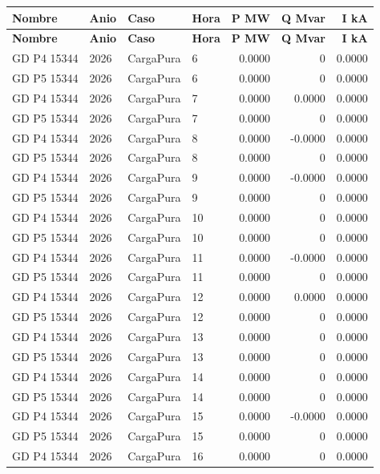 \documentclass[11pt,a4paper]{article}
\begin{document}
\small
\begin{longtable}{llllrrr}
\toprule
\textbf{Nombre} & \textbf{Anio} & \textbf{Caso} & \textbf{Hora} & \textbf{P MW} & \textbf{Q Mvar} & \textbf{I kA} \\
\midrule
\endfirsthead
\toprule
\textbf{Nombre} & \textbf{Anio} & \textbf{Caso} & \textbf{Hora} & \textbf{P MW} & \textbf{Q Mvar} & \textbf{I kA} \\
\midrule
\endhead
\bottomrule
\endfoot
GD P4 15344 & 2026 & CargaPura & 6 & 0.0000 & 0 & 0.0000 \\
GD P5 15344 & 2026 & CargaPura & 6 & 0.0000 & 0 & 0.0000 \\
GD P4 15344 & 2026 & CargaPura & 7 & 0.0000 & 0.0000 & 0.0000 \\
GD P5 15344 & 2026 & CargaPura & 7 & 0.0000 & 0 & 0.0000 \\
GD P4 15344 & 2026 & CargaPura & 8 & 0.0000 & -0.0000 & 0.0000 \\
GD P5 15344 & 2026 & CargaPura & 8 & 0.0000 & 0 & 0.0000 \\
GD P4 15344 & 2026 & CargaPura & 9 & 0.0000 & -0.0000 & 0.0000 \\
GD P5 15344 & 2026 & CargaPura & 9 & 0.0000 & 0 & 0.0000 \\
GD P4 15344 & 2026 & CargaPura & 10 & 0.0000 & 0 & 0.0000 \\
GD P5 15344 & 2026 & CargaPura & 10 & 0.0000 & 0 & 0.0000 \\
GD P4 15344 & 2026 & CargaPura & 11 & 0.0000 & -0.0000 & 0.0000 \\
GD P5 15344 & 2026 & CargaPura & 11 & 0.0000 & 0 & 0.0000 \\
GD P4 15344 & 2026 & CargaPura & 12 & 0.0000 & 0.0000 & 0.0000 \\
GD P5 15344 & 2026 & CargaPura & 12 & 0.0000 & 0 & 0.0000 \\
GD P4 15344 & 2026 & CargaPura & 13 & 0.0000 & 0 & 0.0000 \\
GD P5 15344 & 2026 & CargaPura & 13 & 0.0000 & 0 & 0.0000 \\
GD P4 15344 & 2026 & CargaPura & 14 & 0.0000 & 0 & 0.0000 \\
GD P5 15344 & 2026 & CargaPura & 14 & 0.0000 & 0 & 0.0000 \\
GD P4 15344 & 2026 & CargaPura & 15 & 0.0000 & -0.0000 & 0.0000 \\
GD P5 15344 & 2026 & CargaPura & 15 & 0.0000 & 0 & 0.0000 \\
GD P4 15344 & 2026 & CargaPura & 16 & 0.0000 & 0 & 0.0000 \\

\end{longtable}
\end{document}
